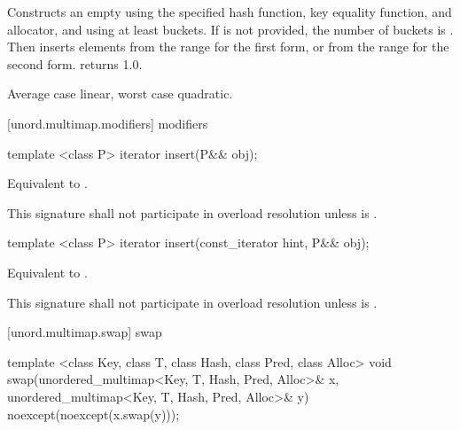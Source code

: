 \begin{itemdescr}
\pnum
\effects Constructs an empty  using the
specified hash function, key equality function, and allocator, and
using at least  buckets. If  is not
provided, the number of buckets is . Then
inserts elements from the range 
for the first form, or from the range 
 for the second form.
 returns 1.0.

\pnum
\complexity Average case linear, worst case quadratic.
\end{itemdescr}

[unord.multimap.modifiers]{ modifiers}

%
%
\begin{itemdecl}
template <class P>
  iterator insert(P&& obj);
\end{itemdecl}

\begin{itemdescr}
\pnum
\effects Equivalent to . 

\pnum
\remarks This signature shall not participate in overload resolution
unless  is .
\end{itemdescr}

%
%
\begin{itemdecl}
template <class P>
  iterator insert(const_iterator hint, P&& obj);
\end{itemdecl}

\begin{itemdescr}
\pnum
\effects Equivalent to 
.

\pnum
\remarks This signature shall not participate in overload resolution
unless  is .
\end{itemdescr}

[unord.multimap.swap]{ swap}

%
%
\begin{itemdecl}
template <class Key, class T, class Hash, class Pred, class Alloc>
  void swap(unordered_multimap<Key, T, Hash, Pred, Alloc>& x,
            unordered_multimap<Key, T, Hash, Pred, Alloc>& y)
    noexcept(noexcept(x.swap(y)));
\end{itemdecl}


